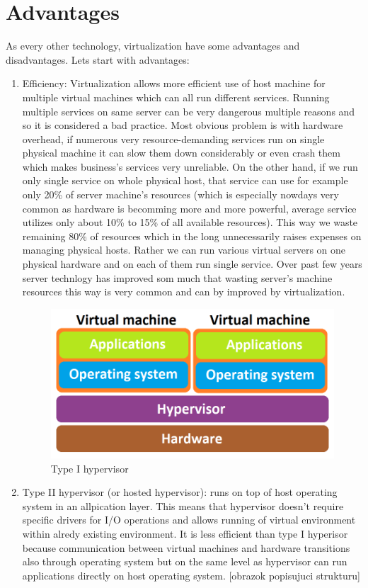 \section{Advantages}
As every other technology, virtualization have some advantages and disadvantages. Lets start with advantages:
\begin{enumerate}
\item Efficiency: Virtualization allows more efficient use of host machine for multiple virtual machines which can all run different services. Running multiple services on same server can be very dangerous multiple reasons and so it is considered a bad practice. Most obvious problem is with hardware overhead, if numerous very resource-demanding services run on single physical machine it can slow them down considerably or even crash them which makes business's services very unreliable. On the other hand, if we run only single service on whole physical host, that service can use for example only 20\% of server machine's resources (which is especially nowdays very common as hardware is becomming more and more powerful, average service utilizes only about 10\% to 15\% of all available resources). This way we waste remaining 80\% of resources which in the long unnecessarily raises expenses on managing physical hosts. Rather we can run various virtual servers on one physical hardware and on each of them run single service. Over past few years server technlogy has improved som much that wasting server's machine resources this way is very common and can by improved by virtualization. 

\begin{figure}[H]
\centering
\includegraphics[scale=0.45]{hyp-type-I.png}
\caption{Type I hypervisor}
\end{figure}

\item Type II hypervisor (or hosted hypervisor): runs on top of host operating system in an allpication layer. This means that hypervisor doesn't require specific drivers for I/O operations and allows running of virtual environment within alredy existing environment. It is less efficient than type I hyperisor because communication between virtual machines and hardware transitions also through operating system but on the same level as hypervisor can run applications directly on host operating system. [obrazok popisujuci strukturu]


\end{enumerate}
